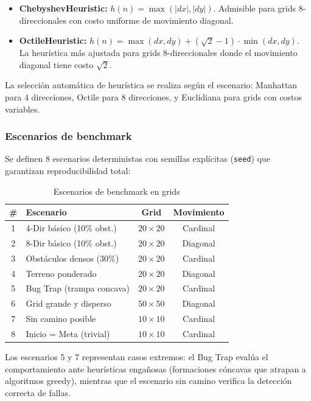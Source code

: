 \begin{itemize}
    \item \textbf{ChebyshevHeuristic:} $h(n) = \max(|dx|, |dy|)$. Admisible para grids 8-direccionales con costo uniforme de movimiento diagonal.
    \item \textbf{OctileHeuristic:} $h(n) = \max(dx, dy) + (\sqrt{2} - 1) \cdot \min(dx, dy)$. La heurística más ajustada para grids 8-direccionales donde el movimiento diagonal tiene costo $\sqrt{2}$.
\end{itemize}

La selección automática de heurística se realiza según el escenario: Manhattan para 4 direcciones, Octile para 8 direcciones, y Euclidiana para grids con costos variables.

\subsubsection{Escenarios de benchmark}

Se definen 8 escenarios deterministas con semillas explícitas (\texttt{seed}) que garantizan reproducibilidad total:

\begin{table}[H]
\centering
\caption{Escenarios de benchmark en grids}
\label{tab:scenarios}
\renewcommand{\arraystretch}{1.2}
\begin{tabular}{@{}clcc@{}}
\toprule
\textbf{\#} & \textbf{Escenario} & \textbf{Grid} & \textbf{Movimiento} \\
\midrule
1 & 4-Dir básico (10\% obst.) & $20 \times 20$ & Cardinal \\
2 & 8-Dir básico (10\% obst.) & $20 \times 20$ & Diagonal \\
3 & Obstáculos densos (30\%) & $20 \times 20$ & Cardinal \\
4 & Terreno ponderado & $20 \times 20$ & Diagonal \\
5 & Bug Trap (trampa concava) & $20 \times 20$ & Cardinal \\
6 & Grid grande y disperso & $50 \times 50$ & Diagonal \\
7 & Sin camino posible & $10 \times 10$ & Cardinal \\
8 & Inicio = Meta (trivial) & $10 \times 10$ & Cardinal \\
\bottomrule
\end{tabular}
\end{table}

Los escenarios 5 y 7 representan casos extremos: el Bug Trap evalúa el comportamiento ante heurísticas engañosas (formaciones cóncavas que atrapan a algoritmos greedy), mientras que el escenario sin camino verifica la detección correcta de fallas.

